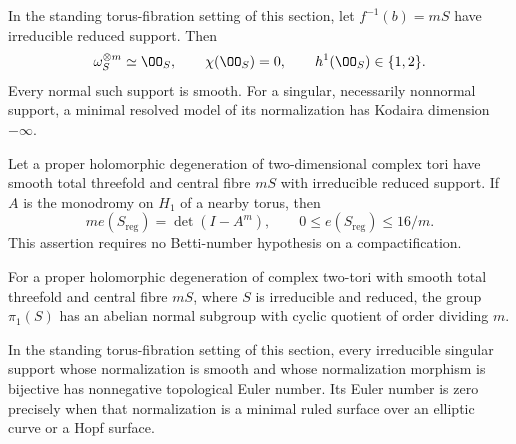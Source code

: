 
\begin{proposition}[P4.12]\hypertarget{tag-02WJ}{}\label{night:P4.12}\label{stmt:P4.12}


In the standing torus-fibration setting of this section, let $f^{-1}(b)=mS$
have irreducible reduced support. Then
\[
 \omega_S^{\otimes m}\simeq\OO_S,\qquad
 \chi(\OO_S)=0,\qquad h^1(\OO_S)\in\{1,2\}.
\]
Every normal such support is smooth. For a singular, necessarily
nonnormal support, a minimal resolved model of its normalization
has Kodaira dimension $-\infty$.
\end{proposition}

\begin{proposition}[P4.13]\hypertarget{tag-02WK}{}\label{night:P4.13}\label{stmt:P4.13}


Let a proper holomorphic degeneration of two-dimensional complex
tori have smooth total threefold and central fibre $mS$ with
irreducible reduced support. If $A$ is the monodromy on $H_1$ of
a nearby torus, then
\[
 m e(S_{\mathrm{reg}})=\det(I-A^m),\qquad
 0\le e(S_{\mathrm{reg}})\le16/m.
\]
This assertion requires no Betti-number hypothesis on a compactification.
\end{proposition}

\begin{proposition}[P4R.1]\hypertarget{tag-02Y2}{}\label{night:P4R.1}\label{stmt:P4R.1}


For a proper holomorphic degeneration of complex two-tori with
smooth total threefold and central fibre $mS$, where $S$ is
irreducible and reduced, the group $\pi_1(S)$ has an abelian
normal subgroup with cyclic quotient of order dividing $m$.
\end{proposition}

\begin{proposition}[P4R.2]\hypertarget{tag-02YD}{}\label{night:P4R.2}\label{stmt:P4R.2}


In the standing torus-fibration setting of this section, every irreducible singular support
whose normalization is smooth and whose normalization morphism
is bijective has nonnegative topological Euler number.
Its Euler number is zero precisely when that normalization is
a minimal ruled surface over an elliptic curve or a Hopf surface.
\end{proposition}

